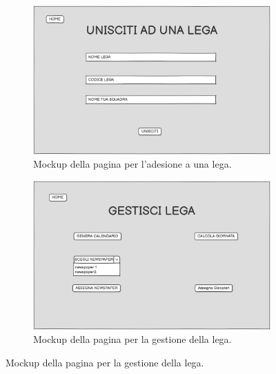 \begin{figure}[H]
    \centering

    \begin{subfigure}[b]{0.49\textwidth}
        \centering
        \includegraphics[width=\textwidth]{Resources/Mockups/UniscitiAdUnaLega.png}
        \caption{Mockup della pagina per l'adesione a una lega.}
        \label{fig:pagina_unisciti_lega}
    \end{subfigure}
    \hfill
    \begin{subfigure}[b]{0.49\textwidth}
        \centering
        \includegraphics[width=\textwidth]{Resources/Mockups/GestisciLega.png}
        \caption{Mockup della pagina per la gestione della lega.}
        \label{fig:pagina_gestisci_lega}
    \end{subfigure}


\end{figure}
